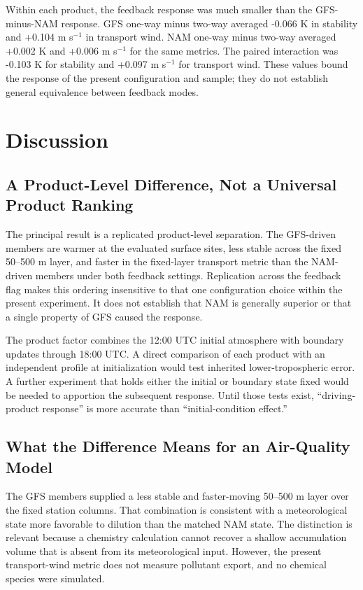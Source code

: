 \documentclass[air,article,submit,moreauthors]{Definitions/mdpi}
\begin{document}
Within each product, the feedback response was much smaller than the GFS-minus-NAM response.
GFS one-way minus two-way averaged -0.066 K in stability and +0.104 m s$^{-1}$ in transport wind.
NAM one-way minus two-way averaged +0.002 K and +0.006 m s$^{-1}$ for the same metrics.
The paired interaction was -0.103 K for stability and +0.097 m s$^{-1}$ for transport wind.
These values bound the response of the present configuration and sample; they do not establish general equivalence between feedback modes.

\section{Discussion}

\subsection{A Product-Level Difference, Not a Universal Product Ranking}

The principal result is a replicated product-level separation.
The GFS-driven members are warmer at the evaluated surface sites, less stable across the fixed 50--500 m layer, and faster in the fixed-layer transport metric than the NAM-driven members under both feedback settings.
Replication across the feedback flag makes this ordering insensitive to that one configuration choice within the present experiment.
It does not establish that NAM is generally superior or that a single property of GFS caused the response.

The product factor combines the 12:00 UTC initial atmosphere with boundary updates through 18:00 UTC.
A direct comparison of each product with an independent profile at initialization would test inherited lower-tropospheric error.
A further experiment that holds either the initial or boundary state fixed would be needed to apportion the subsequent response.
Until those tests exist, ``driving-product response'' is more accurate than ``initial-condition effect.''

\subsection{What the Difference Means for an Air-Quality Model}

The GFS members supplied a less stable and faster-moving 50--500 m layer over the fixed station columns.
That combination is consistent with a meteorological state more favorable to dilution than the matched NAM state.
The distinction is relevant because a chemistry calculation cannot recover a shallow accumulation volume that is absent from its meteorological input.
However, the present transport-wind metric does not measure pollutant export, and no chemical species were simulated.
\end{document}
